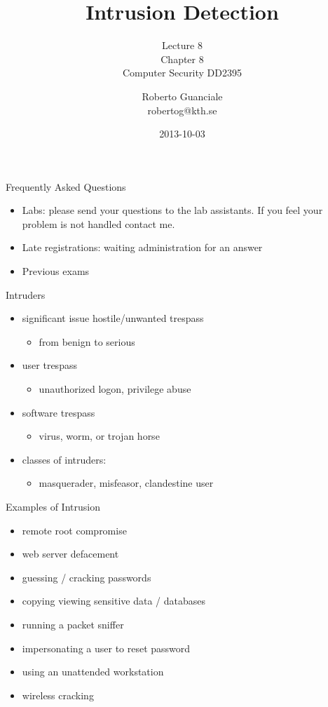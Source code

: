 \documentclass{beamer}
\title{Intrusion Detection}
\subtitle{Lecture 8 \\ Chapter 8\\Computer Security DD2395}
\author[R. Guanciale]{
  Roberto Guanciale\\
  robertog@kth.se
}
\date{2013-10-03}
\begin{document}
\begin{frame}[plain]
  \titlepage
\end{frame}

\begin{frame}{Frequently Asked Questions}
  \begin{itemize}
  \item Labs: please send your questions to the lab assistants. 
    If you feel your problem is not handled contact me.
  \item Late registrations: waiting administration for an answer
  \item Previous exams
  \end{itemize}
\end{frame}

\begin{frame}{Intruders}
  \begin{itemize}
  \item significant issue hostile/unwanted trespass 
    \begin{itemize}
    \item from benign to serious 
    \end{itemize}
  \item user trespass 
    \begin{itemize}
    \item unauthorized logon, privilege abuse 
    \end{itemize}
  \item software trespass 
      \begin{itemize}
      \item virus, worm, or trojan horse 
    \end{itemize}
  \item classes of intruders: 
      \begin{itemize}
      \item masquerader, misfeasor, clandestine user
    \end{itemize}
  \end{itemize}
\end{frame}

\begin{frame}{Examples of Intrusion}
  \begin{itemize}
  \item remote root compromise 
  \item web server defacement 
  \item guessing / cracking passwords 
  \item copying viewing sensitive data / databases 
  \item running a packet sniffer 
  \item impersonating a user to reset password 
  \item using an unattended workstation 
  \item wireless cracking
  \end{itemize}
\end{frame}
\end{document}
